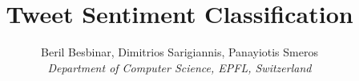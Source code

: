 \documentclass[9pt,conference,compsocconf]{IEEEtran}
\begin{document}
\title{Tweet Sentiment Classification}

\author{Beril Besbinar, Dimitrios Sarigiannis, Panayiotis Smeros\\
\textit{Department of Computer Science, EPFL, Switzerland}}

\maketitle


















\cleardoublepage


\end{document}
